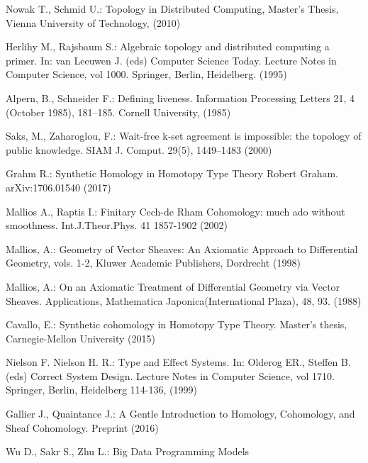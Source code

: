 \documentclass[runningheads]{llncs}
\begin{document}
%
%
%


%
\begin{thebibliography}{8}
Nowak T., Schmid U.: Topology in Distributed Computing, Master's Thesis, Vienna University of Technology, (2010)

Herlihy M., Rajsbaum S.: Algebraic topology and distributed computing a primer. In: van Leeuwen J. (eds) Computer Science Today. Lecture Notes in Computer Science, vol 1000. Springer, Berlin, Heidelberg. (1995) 

Alpern, B., Schneider F.: Defining liveness. Information Processing Letters 21, 4 (October 1985), 181--185. Cornell University, (1985)

Saks, M., Zaharoglou, F.: Wait-free k-set agreement is impossible: the topology of public knowledge. SIAM J. Comput. 29(5), 1449–1483 (2000)

Grahm R.: Synthetic Homology in Homotopy Type Theory Robert Graham. arXiv:1706.01540 (2017)

Mallios A., Raptis I.: Finitary Cech-de Rham Cohomology: much ado without smoothness. Int.J.Theor.Phys. 41 1857-1902 (2002)

Mallios, A.: Geometry of Vector Sheaves: An Axiomatic Approach to Differential Geometry, vols. 1-2, Kluwer Academic Publishers, Dordrecht (1998)

Mallios, A.: On an Axiomatic Treatment of Differential Geometry via Vector Sheaves. Applications, Mathematica Japonica(International Plaza), 48, 93. (1988)

Cavallo, E.: Synthetic cohomology in Homotopy Type Theory. Master’s thesis, Carnegie-Mellon University (2015)

Nielson F. Nielson H. R.: Type and Effect Systems. In: Olderog ER., Steffen B. (eds) Correct System Design. Lecture Notes in Computer Science, vol 1710. Springer, Berlin, Heidelberg 114-136, (1999)

Gallier J., Quaintance J.: A Gentle Introduction to Homology, Cohomology, and  Sheaf Cohomology. Preprint (2016)

Wu D., Sakr S., Zhu L.: Big Data Programming Models 


\end{thebibliography}
\end{document}
